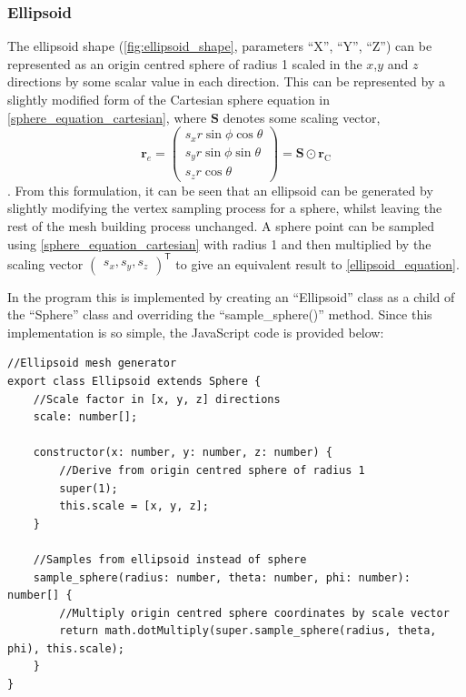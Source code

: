 
\subsubsection{Ellipsoid}
The ellipsoid shape (\cref{fig:ellipsoid_shape}, parameters ``X'', ``Y'', ``Z'') can be represented as an origin centred sphere of radius 1 scaled in the $x$,$y$ and $z$ directions by some scalar value in each direction. This can be represented by a slightly modified form of the Cartesian sphere equation in \cref{sphere_equation_cartesian}, where $\mathbf{S}$ denotes some scaling vector,
\begin{equation}
\mathbf{r}_{e}=\begin{pmatrix}s_x r\sin\phi \cos\theta\\
s_y r\sin\phi \sin\theta\\
s_z r\cos\theta\end{pmatrix}
=\mathbf{S} \odot \mathbf{r}_\mathrm{C}
\label{ellipsoid_equation}
\end{equation}.
From this formulation, it can be seen that an ellipsoid can be generated by slightly modifying the vertex sampling process for a sphere, whilst leaving the rest of the mesh building process unchanged. A sphere point can be sampled using \cref{sphere_equation_cartesian} with radius 1 and then multiplied by the scaling vector $\begin{pmatrix}s_x,s_y,s_z\end{pmatrix}^\mathsf{T}$ to give an equivalent result to \cref{ellipsoid_equation}.

In the program this is implemented by creating an ``Ellipsoid'' class as a child of the ``Sphere'' class and overriding the ``sample\_sphere()'' method. Since this implementation is so simple, the JavaScript code is provided below:

\begin{adjustbox}{width=\textwidth}
\begin{lstlisting}
//Ellipsoid mesh generator
export class Ellipsoid extends Sphere {
    //Scale factor in [x, y, z] directions
    scale: number[];

    constructor(x: number, y: number, z: number) {
        //Derive from origin centred sphere of radius 1
        super(1);
        this.scale = [x, y, z];
    }

    //Samples from ellipsoid instead of sphere
    sample_sphere(radius: number, theta: number, phi: number): number[] {
        //Multiply origin centred sphere coordinates by scale vector
        return math.dotMultiply(super.sample_sphere(radius, theta, phi), this.scale);
    }
}
\end{lstlisting}
\end{adjustbox}

